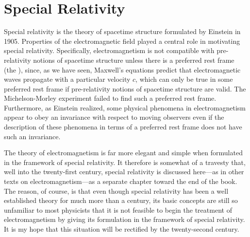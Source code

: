\setcounter{chapter}{0}
\renewcommand{\thechapter}{8}
\chapter{Special Relativity}\label{ch:8}
\setcounter{equation}{0}	        %

Special relativity is the theory of spacetime structure formulated by Einstein in 1905. Properties of the electromagnetic field played a central role in motivating special relativity. Specifically, electromagnetism is not compatible with pre-relativity notions of spacetime structure unless there is a preferred rest frame (the ), since, as we have seen, Maxwell's equations predict that electromagnetic waves propagate with a particular velocity $c$, which can only be true in some preferred rest frame if pre-relativity notions of spacetime structure are valid. The Michelson-Morley experiment failed to find such a preferred rest frame. Furthermore, as Einstein realized, some physical phenomena in electromagnetism appear to obey an invariance with respect to moving observers even if the description of these phenomena in terms of a preferred rest frame does not have such an invariance.

The theory of electromagnetism is far more elegant and simple when formulated in the framework of special relativity. It therefore is somewhat of a travesty that, well into the twenty-first century, special relativity is discussed here---as in other texts on electromagnetism---as a separate chapter toward the end of the book. The reason, of course, is that even though special relativity has been a well established theory for much more than a century, its basic concepts are still so unfamiliar to most physicists that it is not feasible to begin the treatment of electromagnetism by giving its formulation in the framework of special relativity. It is my hope that this situation will be rectified by the twenty-second century.

